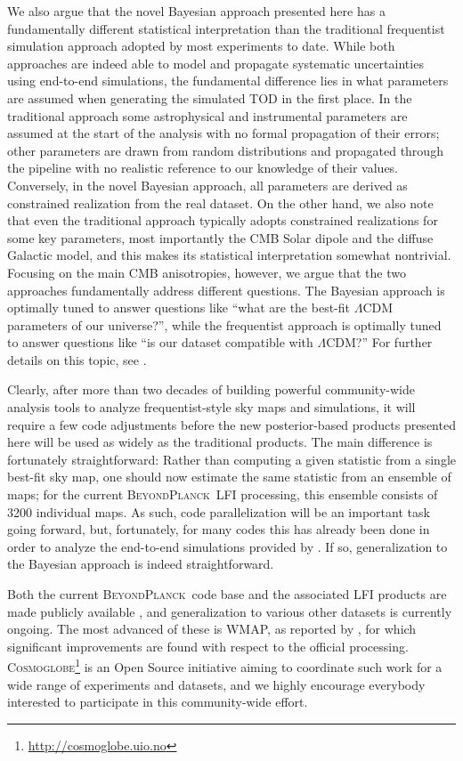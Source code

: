 \documentclass[twocolumn]{aa}
\def\WMAP{WMAP}
\newcommand{\BP}{\textsc{BeyondPlanck}}
\begin{document}
We also argue that the novel Bayesian approach presented here has a
fundamentally different statistical interpretation than the
traditional frequentist simulation approach adopted by most
experiments to date. While both approaches are indeed
able to model and propagate systematic uncertainties using end-to-end
simulations, the fundamental difference lies in what parameters are
assumed when generating the simulated TOD in the first place. In the
traditional approach some astrophysical and instrumental parameters
are assumed at the start of the analysis with no formal propagation of
their errors; other parameters are drawn from random distributions and
propagated through the pipeline with no realistic reference to our
knowledge of their values. Conversely, in the novel Bayesian approach,
all parameters are derived as constrained realization from the real
dataset. On the other hand, we also note that even the traditional
approach typically adopts constrained realizations for some key
parameters, most importantly the CMB Solar dipole and the diffuse
Galactic model, and this makes its statistical interpretation somewhat
nontrivial. Focusing on the main CMB anisotropies, however, we argue
that the two approaches fundamentally address different questions. The
Bayesian approach is optimally tuned to answer questions like ``what
are the best-fit $\Lambda$CDM parameters of our universe?'', while the
frequentist approach is optimally tuned to answer questions like ``is
our dataset compatible with $\Lambda$CDM?'' For further details on this topic, see \citet{bp04}.

Clearly, after more than two decades of building powerful
community-wide analysis tools to analyze frequentist-style sky maps
and simulations, it will require a few code adjustments before the new
posterior-based products presented here will be used as widely as the
traditional products. The main difference is fortunately
straightforward: Rather than computing a given statistic from a single
best-fit sky map, one should now estimate the same statistic from an
ensemble of maps; for the current \BP\ LFI processing, this ensemble
consists of 3200 individual maps. As such, code parallelization will
be an important task going forward, but, fortunately, for many codes
this has already been done in order to analyze the end-to-end
simulations provided by \Planck. If so, generalization to the Bayesian
approach is indeed straightforward.

Both the current \BP\ code base and the associated LFI products are
made publicly available \citep{bp05}, and generalization to various
other datasets is currently ongoing. The most advanced of these is
\WMAP, as reported by \citet{bp17}, for which significant improvements
are found with respect to the official
processing. \textsc{Cosmoglobe}\footnote{\url{http://cosmoglobe.uio.no}}
is an Open Source initiative aiming to coordinate such work for a wide
range of experiments and datasets, and we highly encourage everybody
interested to participate in this community-wide effort.








\end{document}
